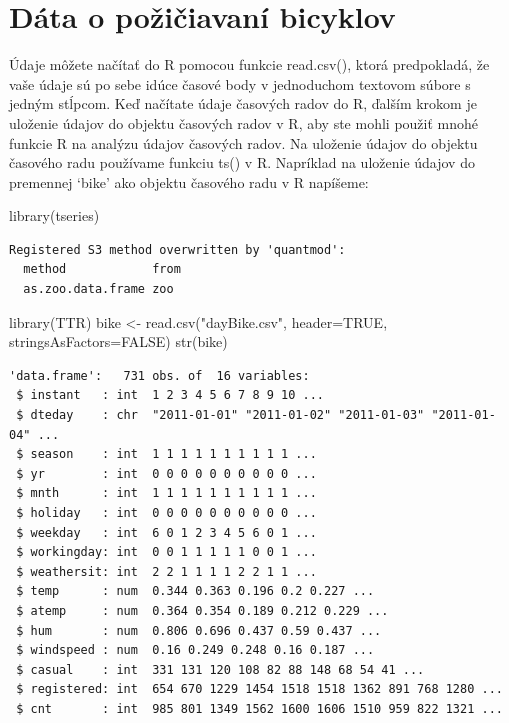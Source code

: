 \documentclass[
  letterpaper,
  DIV=11,
  numbers=noendperiod]{scrreprt}
\newenvironment{Shaded}{\begin{snugshade}}{\end{snugshade}}
\newcommand{\AttributeTok}[1]{\textcolor[rgb]{0.40,0.45,0.13}{#1}}
\newcommand{\ConstantTok}[1]{\textcolor[rgb]{0.56,0.35,0.01}{#1}}
\newcommand{\FunctionTok}[1]{\textcolor[rgb]{0.28,0.35,0.67}{#1}}
\newcommand{\NormalTok}[1]{\textcolor[rgb]{0.00,0.23,0.31}{#1}}
\newcommand{\OtherTok}[1]{\textcolor[rgb]{0.00,0.23,0.31}{#1}}
\newcommand{\StringTok}[1]{\textcolor[rgb]{0.13,0.47,0.30}{#1}}
\begin{document}
\chapter{Dáta o požičiavaní
bicyklov}\label{duxe1ta-o-poux17eiux10diavanuxed-bicyklov}

Údaje môžete načítať do R pomocou funkcie read.csv(), ktorá predpokladá,
že vaše údaje sú po sebe idúce časové body v jednoduchom textovom súbore
s jedným stĺpcom. Keď načítate údaje časových radov do R, ďalším krokom
je uloženie údajov do objektu časových radov v R, aby ste mohli použiť
mnohé funkcie R na analýzu údajov časových radov. Na uloženie údajov do
objektu časového radu používame funkciu ts() v R. Napríklad na uloženie
údajov do premennej `bike' ako objektu časového radu v R napíšeme:

\begin{Shaded}
\begin{Highlighting}[]
\FunctionTok{library}\NormalTok{(tseries)}
\end{Highlighting}
\end{Shaded}

\begin{verbatim}
Registered S3 method overwritten by 'quantmod':
  method            from
  as.zoo.data.frame zoo 
\end{verbatim}

\begin{Shaded}
\begin{Highlighting}[]
\FunctionTok{library}\NormalTok{(TTR)}
\NormalTok{bike }\OtherTok{\textless{}{-}} \FunctionTok{read.csv}\NormalTok{(}\StringTok{"dayBike.csv"}\NormalTok{, }\AttributeTok{header=}\ConstantTok{TRUE}\NormalTok{, }\AttributeTok{stringsAsFactors=}\ConstantTok{FALSE}\NormalTok{)}
\FunctionTok{str}\NormalTok{(bike)}
\end{Highlighting}
\end{Shaded}

\begin{verbatim}
'data.frame':   731 obs. of  16 variables:
 $ instant   : int  1 2 3 4 5 6 7 8 9 10 ...
 $ dteday    : chr  "2011-01-01" "2011-01-02" "2011-01-03" "2011-01-04" ...
 $ season    : int  1 1 1 1 1 1 1 1 1 1 ...
 $ yr        : int  0 0 0 0 0 0 0 0 0 0 ...
 $ mnth      : int  1 1 1 1 1 1 1 1 1 1 ...
 $ holiday   : int  0 0 0 0 0 0 0 0 0 0 ...
 $ weekday   : int  6 0 1 2 3 4 5 6 0 1 ...
 $ workingday: int  0 0 1 1 1 1 1 0 0 1 ...
 $ weathersit: int  2 2 1 1 1 1 2 2 1 1 ...
 $ temp      : num  0.344 0.363 0.196 0.2 0.227 ...
 $ atemp     : num  0.364 0.354 0.189 0.212 0.229 ...
 $ hum       : num  0.806 0.696 0.437 0.59 0.437 ...
 $ windspeed : num  0.16 0.249 0.248 0.16 0.187 ...
 $ casual    : int  331 131 120 108 82 88 148 68 54 41 ...
 $ registered: int  654 670 1229 1454 1518 1518 1362 891 768 1280 ...
 $ cnt       : int  985 801 1349 1562 1600 1606 1510 959 822 1321 ...
\end{verbatim}
\end{document}

